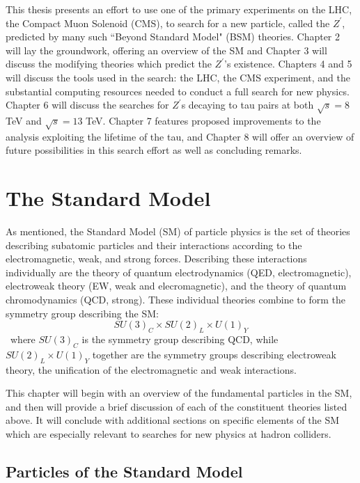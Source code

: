 This thesis presents an effort to use one of the primary experiments on the LHC, the Compact Muon Solenoid (CMS), to search for a new particle, called the \emph{$Z^\prime$}, predicted by many such ``Beyond Standard Model" (BSM) theories. Chapter 2 will lay the groundwork, offering an overview of the SM and Chapter 3 will discuss the modifying theories which predict the $Z^\prime$'s existence. Chapters 4 and 5 will discuss the tools used in the search: the LHC, the CMS experiment, and the substantial computing resources needed to conduct a full search for new physics. Chapter 6 will discuss the searches for $Z^\prime$s decaying to tau pairs at both $\sqrt{s} = 8$ TeV and $\sqrt{s} = 13$ TeV. Chapter 7 features proposed improvements to the analysis exploiting the lifetime of the tau, and Chapter 8 will offer an overview of future possibilities in this search effort as well as concluding remarks.
\clearpage

\chapter{The Standard Model}


As mentioned, the Standard Model (SM) of particle physics is the set of theories describing subatomic particles and their interactions according to the electromagnetic, weak, and strong forces. Describing these interactions individually are the theory of quantum electrodynamics (QED, electromagnetic), electroweak theory (EW, weak and elecromagnetic), and the theory of quantum chromodynamics (QCD, strong). These individual theories combine to form the symmetry group describing the SM:
\begin{equation}
SU(3)_{C} \times SU(2)_{L} \times U(1)_{Y}
\end{equation}
\noindent\ where $SU(3)_{C}$ is the symmetry group describing QCD, while $SU(2)_{L} \times U(1)_{Y}$ together are the symmetry groups describing electroweak theory, the unification of the electromagnetic and weak interactions.

This chapter will begin with an overview of the fundamental particles in the SM, and then will provide a brief discussion of each of the constituent theories listed above. It will conclude with additional sections on specific elements of the SM which are especially relevant to searches for new physics at hadron colliders.

\section{Particles of the Standard Model}

